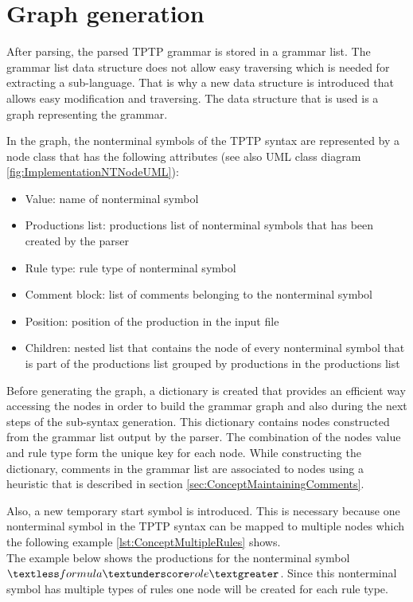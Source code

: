 \section{Graph generation}\label{sec:ConceptGraphGeneration}

After parsing, the parsed \ac{TPTP} grammar is stored in a grammar list. The grammar list data structure does not allow easy traversing which is needed for extracting a sub-language. That is why a new data structure is introduced that allows easy modification and traversing. The data structure that is used is a graph representing the
grammar.

In the graph, the nonterminal symbols of the \ac{TPTP} syntax are represented by a node class that has the following attributes (see also UML class diagram \ref{fig:ImplementationNTNodeUML}):
\begin{itemize}
\item Value: name of nonterminal symbol
\item Productions list: productions list of nonterminal symbols that has been created by the parser
\item Rule type: rule type of nonterminal symbol
\item Comment block: list of comments belonging to the nonterminal symbol
\item Position: position of the production in the input file
\item Children: nested list that contains the node of every nonterminal symbol that is part of the productions list grouped by productions in the productions list
\end{itemize}

Before generating the graph, a dictionary is created that provides an efficient way accessing the nodes in order to build the grammar graph and also during the next steps of the sub-syntax generation.
This dictionary contains nodes constructed from the grammar list output by the parser. The combination of the nodes value and rule type form the unique key for each node. While constructing the dictionary, comments in the grammar list are associated to nodes using a heuristic that is described in section \ref{sec:ConceptMaintainingComments}.

Also, a new temporary start symbol is introduced.
This is necessary because one nonterminal symbol in the \ac{TPTP} syntax can be mapped to multiple nodes which the following example \ref{lst:ConceptMultipleRules} shows. \\
The example below shows the productions for the nonterminal symbol \\
$\textless formula\textunderscore role\textgreater$.
Since this nonterminal symbol has multiple types of rules one node will be created for each rule type.

